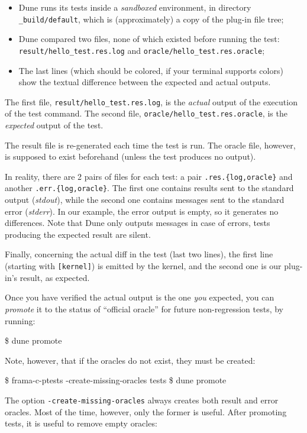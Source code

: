 \begin{itemize}
\item Dune runs its tests inside a {\em sandboxed} environment, in directory
  \verb|_build/default|, which is (approximately) a copy of the plug-in
  file tree;
\item Dune compared two files, none of which existed before running the test:
  \verb|result/hello_test.res.log| and \verb|oracle/hello_test.res.oracle|;
\item The last lines (which should be colored, if your terminal supports colors)
  show the textual difference between the expected and actual outputs.
\end{itemize}

The first file, \verb|result/hello_test.res.log|, is the {\em actual} output of
the execution of the test command.
The second file, \verb|oracle/hello_test.res.oracle|, is the {\em expected}
output of the test.

The result file is re-generated each time the test is run.
The oracle file, however, is supposed to exist beforehand
(unless the test produces no output).

In reality, there are 2 pairs of files for each test: a pair
\texttt{.res.\{log,oracle\}} and another \texttt{.err.\{log,oracle\}}.
The first one contains results sent to the standard output ({\em stdout}),
while the second one contains messages sent to the standard error
({\em stderr}). In our example, the error output is empty, so it generates no
differences. Note that Dune only outputs messages in case of errors,
\ie tests producing the expected result are silent.

Finally, concerning the actual diff in the test (last two lines), the first
line (starting with \texttt{[kernel]}) is emitted by the \framac kernel,
and the second one is our plug-in's result, as expected.

Once you have verified the actual output is the one {\em you} expected,
you can {\em promote} it to the status of ``official oracle'' for future
non-regression tests, by running:
\begin{shell}
\$ dune promote
\end{shell}
Note, however, that if the oracles do not exist, they must be created:
\begin{shell}
\$ frama-c-ptests -create-missing-oracles tests
\$ dune promote
\end{shell}

The option \texttt{-create-missing-oracles} always creates both result and
error oracles. Most of the time, however, only the former is useful.
After promoting tests, it is useful to remove empty oracles:

